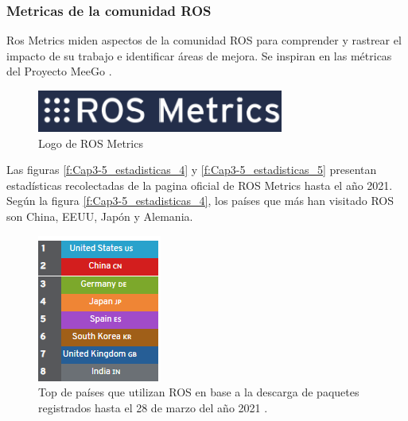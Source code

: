          \newpage
    
        \subsubsection{Metricas de la comunidad ROS}
    
    Ros Metrics miden aspectos de la comunidad ROS para comprender y rastrear el impacto de su trabajo e identificar áreas de mejora. Se inspiran en las métricas del Proyecto MeeGo .
    
        \begin{figure}[htb]
            \centering
            \includegraphics[width=0.4\linewidth]{Main/Chapter3/Images3/cap3_estadisticas_3.png}
            \caption{Logo de ROS Metrics \cite{rosmetrics}}
            \label{f:Cap3-5_estadisticas_3}
        \end{figure}  
        
        Las figuras \eqref{f:Cap3-5_estadisticas_4} y \eqref{f:Cap3-5_estadisticas_5} presentan estadísticas recolectadas de la pagina oficial de ROS Metrics hasta el año 2021. Según la figura \eqref{f:Cap3-5_estadisticas_4}, los países que más han visitado ROS son China, EEUU, Japón y Alemania. 
        
        \begin{figure}[htb]
            \centering
            \includegraphics[width=0.27\linewidth]{Main/Chapter3/Images3/cap3_estadisticas_7.png}
            \caption{Top de países que utilizan ROS en base a la descarga de paquetes registrados hasta el 28 de marzo del año 2021 \cite{rosmetrics}.}
            \label{f:Cap3-5_estadisticas_4}
        \end{figure}  
        

